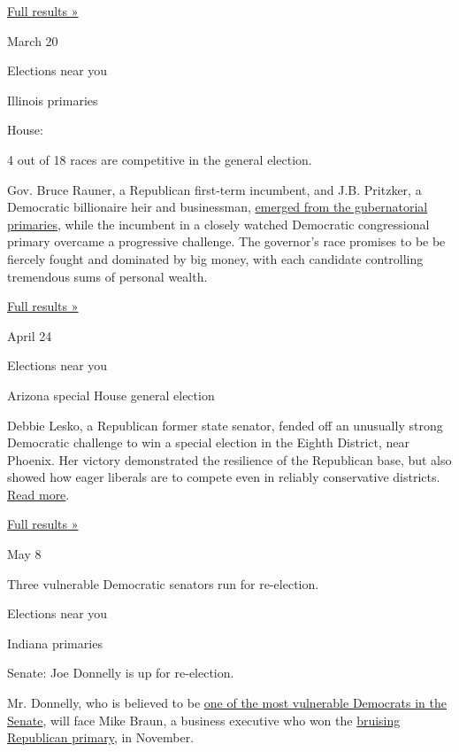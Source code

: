 \href{https://www.nytimes3xbfgragh.onion/interactive/2018/03/13/us/elections/results-pennsylvania-house-special-election.html}{Full
results »}

March 20

Elections near you

Illinois primaries

House:

4 out of 18 races are competitive in the general election.

Gov. Bruce Rauner, a Republican first-term incumbent, and J.B. Pritzker,
a Democratic billionaire heir and businessman,
\href{https://www.nytimes3xbfgragh.onion/2018/03/20/us/politics/bruce-rauner-governor-illinois.html}{emerged
from the gubernatorial primaries}, while the incumbent in a closely
watched Democratic congressional primary overcame a progressive
challenge. The governor's race promises to be be fiercely fought and
dominated by big money, with each candidate controlling tremendous sums
of personal wealth.

\href{https://www.nytimes3xbfgragh.onion/interactive/2018/03/20/us/elections/results-illinois-primary-elections.html}{Full
results »}

April 24

Elections near you

Arizona special House general election

Debbie Lesko, a Republican former state senator, fended off an unusually
strong Democratic challenge to win a special election in the Eighth
District, near Phoenix. Her victory demonstrated the resilience of the
Republican base, but also showed how eager liberals are to compete even
in reliably conservative districts.
\href{https://www.nytimes3xbfgragh.onion/2018/04/24/us/politics/debbie-lesko-arizona-congress.html}{Read
more}.

\href{https://www.nytimes3xbfgragh.onion/interactive/2018/04/24/us/elections/results-arizona-house-special-election.html}{Full
results »}

May 8

Three vulnerable Democratic senators run for re-election.

Elections near you

Indiana primaries

Senate: Joe Donnelly is up for re-election.

Mr. Donnelly, who is believed to be
\href{https://www.nytimes3xbfgragh.onion/2017/10/20/us/politics/trump-donnelly-reelection.html}{one
of the most vulnerable Democrats in the Senate}, will face Mike Braun, a
business executive who won the
\href{https://www.nytimes3xbfgragh.onion/2018/04/02/us/politics/republican-senate-primary-fights-indiana.html}{bruising
Republican primary}, in November.

